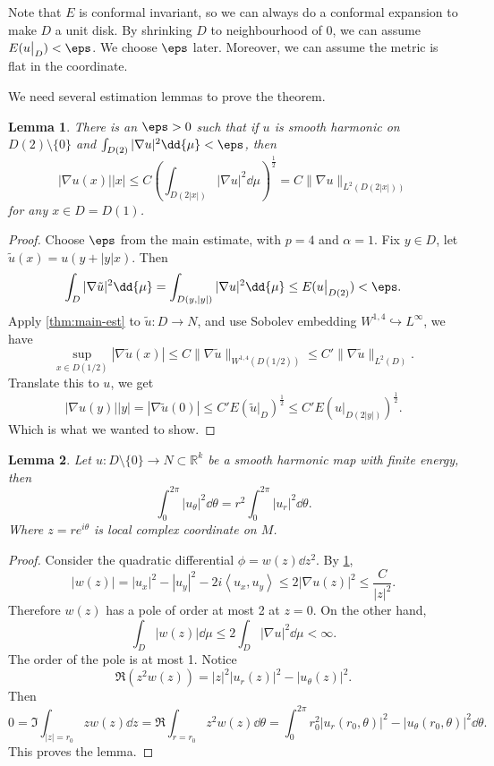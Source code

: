 \documentclass[UTF8,12pt]{article}
\theoremstyle{plain}\newtheorem{theorem}{Theorem}
\theoremstyle{definition}\newtheorem{definition}[theorem]{Definition}
\theoremstyle{definition}\newtheorem{example}[theorem]{Example}
\theoremstyle{plain}\newtheorem{axiom}[theorem]{Axiom}
\theoremstyle{plain}\newtheorem{assertion}[theorem]{Assertion}
\theoremstyle{plain}\newtheorem{corollary}[theorem]{Corollary}
\theoremstyle{plain}\newtheorem{lemma}[theorem]{Lemma}
\theoremstyle{plain}\newtheorem{proposition}[theorem]{Proposition}
\theoremstyle{plain}\newtheorem{prop}[theorem]{Proposition}
\theoremstyle{plain}\newtheorem{conjecture}[theorem]{Conjecture}
\theoremstyle{plain}\newtheorem{conj}[theorem]{Conjecture}
\theoremstyle{plain}\newtheorem{problem}[theorem]{Problem}
\theoremstyle{remark}\newtheorem{notation}[theorem]{Notation}
\theoremstyle{definition}\newtheorem*{question}{Question}
\theoremstyle{definition}\newtheorem*{answer}{Answer}
\theoremstyle{definition}\newtheorem*{goal}{Goal}
\theoremstyle{plain}\newtheorem*{application}{Application}
\theoremstyle{plain}\newtheorem*{exercise}{Exercise}
\theoremstyle{remark}\newtheorem*{remark}{Remark}
\theoremstyle{remark}\newtheorem*{note}{\small{Note}}
\numberwithin{equation}{section}
\numberwithin{theorem}{section}
\numberwithin{figure}{section}
\begin{document}
Note that \(E\) is conformal invariant, so we can always do a conformal expansion
to make \(D\) a unit disk. By shrinking \(D\) to neighbourhood of 0, we can assume
\(E(u\big|_{D})<\eps\). We choose \(\eps\) later. Moreover, we can assume the
metric is flat in the coordinate.

We need several estimation lemmas to prove the theorem.
\begin{lemma}\label{lem:sup-est}
    There is an \(\eps>0\) such that if \(u\) is smooth harmonic on \(D(2)\setminus\{0\}\) and
    \(\int_{D(2)}|\nabla u|^2\dd{\mu}<\eps\), then \[
        |\nabla u(x)||x|
        \le C\left(\int_{D(2|x|)}|\nabla u|^2\dd{\mu}\right)^{\frac{1}{2}}
        =C\|\nabla u\|_{L^2(D(2|x|))}
    \] for any \(x\in D=D(1)\).
\end{lemma}
\begin{proof}
    Choose \(\eps\) from the main estimate, with \(p=4\) and \(\alpha=1\). Fix
    \(y\in D\), let \(\tilde{u}(x)=u(y+|y|x)\). Then \[
        \int_{D}|\nabla\tilde{u}|^2\dd{\mu}
        =\int_{D(y,|y|)}|\nabla u|^2\dd{\mu}
        \le E(u\big|_{D(2)})<\eps
    .\] Apply \cref{thm:main-est} to \(\tilde{u}\colon D\to N\), and use Sobolev
    embedding \(W^{1,4}\hookrightarrow L^\infty\), we have \[
        \sup_{x\in D(1/2)}|\nabla \tilde{u}(x)|
        \le C\|\nabla \tilde{u}\|_{W^{1,4}(D(1/2))}
        \le C'\|\nabla \tilde{u}\|_{L^2(D)}
    .\] Translate this to \(u\), we get \[
        |\nabla u(y)||y|=|\nabla\tilde{u}(0)|
        \le C'E\left(\tilde{u}\big|_{D}\right)^{\frac{1}{2}}
        \le C'E\left(u\big|_{D(2|y|)}\right)^{\frac{1}{2}}
    .\] Which is what we wanted to show.
\end{proof}
\begin{lemma}\label{lem:circle-integral}
    Let \(u\colon D\setminus\{0\}\to N\subset \mathbb{R}^k\) be a smooth harmonic
    map with finite energy, then \[
        \int_{0}^{2\pi}|u_\theta|^2\dd{\theta}
        =r^2 \int_{0}^{2\pi}|u_r|^2\dd{\theta}
    .\] Where \(z=re^{i\theta}\) is local complex coordinate on \(M\).
\end{lemma}
\begin{proof}
    Consider the quadratic differential \(\phi=w(z)\dd{z}^2\). By
    \cref{lem:sup-est}, \[
        |w(z)|=|u_x|^2-|u_y|^2-2i\left<u_x,u_y\right>\le 2|\nabla u(z)|^2
        \le \frac{C}{|z|^2}
    .\] Therefore \(w(z)\) has a pole of order at most 2 at \(z=0\).
    On the other hand, \[
        \int_{D}|w(z)|\dd{\mu}\le 2\int_{D}|\nabla u|^2\dd{\mu}<\infty
    .\] The order of the pole is at most 1. Notice \[
        \Re(z^2 w(z))=|z|^2|u_r(z)|^2-|u_\theta(z)|^2
    .\] Then \[
        0=\Im\int_{|z|=r_0}zw(z)\dd{z}
        =\Re \int_{r=r_0}z^2w(z)\dd{\theta}
        =\int_{0}^{2\pi}r_0^2|u_r(r_0,\theta)|^2-|u_\theta(r_0,\theta)|^2\dd{\theta}
    .\] This proves the lemma.
\end{proof}
\end{document}
